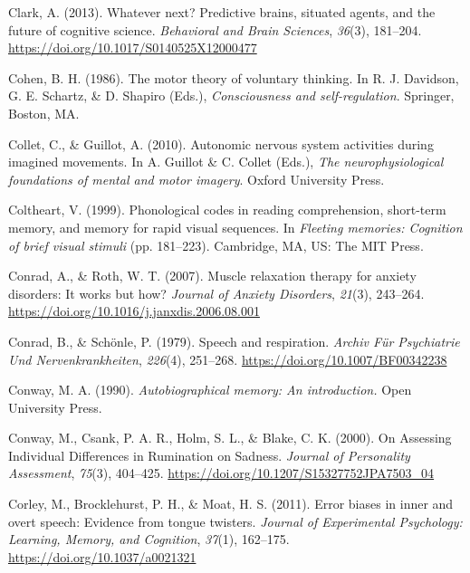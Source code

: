 \documentclass[a4paper,12pt,twoside,openright,oldfontcommands]{memoir}
\begin{document}
\leavevmode\hypertarget{ref-clark_whatever_2013}{}%
Clark, A. (2013). Whatever next? Predictive brains, situated agents, and the future of cognitive science. \emph{Behavioral and Brain Sciences}, \emph{36}(3), 181--204. \url{https://doi.org/10.1017/S0140525X12000477}

\leavevmode\hypertarget{ref-cohen_motor_1986}{}%
Cohen, B. H. (1986). The motor theory of voluntary thinking. In R. J. Davidson, G. E. Schartz, \& D. Shapiro (Eds.), \emph{Consciousness and self-regulation}. Springer, Boston, MA.

\leavevmode\hypertarget{ref-collet_autonomic_2010}{}%
Collet, C., \& Guillot, A. (2010). Autonomic nervous system activities during imagined movements. In A. Guillot \& C. Collet (Eds.), \emph{The neurophysiological foundations of mental and motor imagery}. Oxford University Press.

\leavevmode\hypertarget{ref-coltheart_phonological_1999}{}%
Coltheart, V. (1999). Phonological codes in reading comprehension, short-term memory, and memory for rapid visual sequences. In \emph{Fleeting memories: Cognition of brief visual stimuli} (pp. 181--223). Cambridge, MA, US: The MIT Press.

\leavevmode\hypertarget{ref-conrad_muscle_2007}{}%
Conrad, A., \& Roth, W. T. (2007). Muscle relaxation therapy for anxiety disorders: It works but how? \emph{Journal of Anxiety Disorders}, \emph{21}(3), 243--264. \url{https://doi.org/10.1016/j.janxdis.2006.08.001}

\leavevmode\hypertarget{ref-conrad_speech_1979}{}%
Conrad, B., \& Schönle, P. (1979). Speech and respiration. \emph{Archiv Für Psychiatrie Und Nervenkrankheiten}, \emph{226}(4), 251--268. \url{https://doi.org/10.1007/BF00342238}

\leavevmode\hypertarget{ref-conway_autobiographical_1990}{}%
Conway, M. A. (1990). \emph{Autobiographical memory: An introduction.} Open University Press.

\leavevmode\hypertarget{ref-conway_assessing_2000}{}%
Conway, M., Csank, P. A. R., Holm, S. L., \& Blake, C. K. (2000). On Assessing Individual Differences in Rumination on Sadness. \emph{Journal of Personality Assessment}, \emph{75}(3), 404--425. \url{https://doi.org/10.1207/S15327752JPA7503_04}

\leavevmode\hypertarget{ref-corley_error_2011}{}%
Corley, M., Brocklehurst, P. H., \& Moat, H. S. (2011). Error biases in inner and overt speech: Evidence from tongue twisters. \emph{Journal of Experimental Psychology: Learning, Memory, and Cognition}, \emph{37}(1), 162--175. \url{https://doi.org/10.1037/a0021321}
\end{document}
